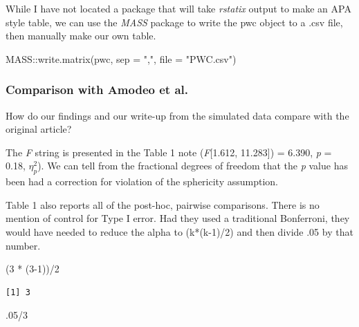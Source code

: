 \documentclass[
  11pt,
]{book}
\newenvironment{Shaded}{\begin{snugshade}}{\end{snugshade}}
\newcommand{\AttributeTok}[1]{\textcolor[rgb]{0.77,0.63,0.00}{#1}}
\newcommand{\DecValTok}[1]{\textcolor[rgb]{0.00,0.00,0.81}{#1}}
\newcommand{\FunctionTok}[1]{\textcolor[rgb]{0.00,0.00,0.00}{#1}}
\newcommand{\NormalTok}[1]{#1}
\newcommand{\SpecialCharTok}[1]{\textcolor[rgb]{0.00,0.00,0.00}{#1}}
\newcommand{\StringTok}[1]{\textcolor[rgb]{0.31,0.60,0.02}{#1}}
\begin{document}
While I have not located a package that will take \emph{rstatix} output to make an APA style table, we can use the \emph{MASS} package to write the pwc object to a .csv file, then manually make our own table.

\begin{Shaded}
\begin{Highlighting}[]
\NormalTok{MASS}\SpecialCharTok{::}\FunctionTok{write.matrix}\NormalTok{(pwc, }\AttributeTok{sep =} \StringTok{","}\NormalTok{, }\AttributeTok{file =} \StringTok{"PWC.csv"}\NormalTok{)}
\end{Highlighting}
\end{Shaded}

\hypertarget{comparison-with-amodeo-et-al.-amodeo_empowering_2018}{%
\subsubsection{\texorpdfstring{Comparison with Amodeo et al.\citeyearpar{amodeo_empowering_2018}}{Comparison with Amodeo et al.{[}-@amodeo\_empowering\_2018{]}}}\label{comparison-with-amodeo-et-al.-amodeo_empowering_2018}}

How do our findings and our write-up from the simulated data compare with the original article?

The \emph{F} string is presented in the Table 1 note (\emph{F}{[}1.612, 11.283{]}) = 6.390, \emph{p} = 0.18, \(\eta _{p}^{2}\)). We can tell from the fractional degrees of freedom that the \emph{p} value has been had a correction for violation of the sphericity assumption.

Table 1 also reports all of the post-hoc, pairwise comparisons. There is no mention of control for Type I error. Had they used a traditional Bonferroni, they would have needed to reduce the alpha to (k*(k-1)/2) and then divide .05 by that number.

\begin{Shaded}
\begin{Highlighting}[]
\NormalTok{(}\DecValTok{3} \SpecialCharTok{*}\NormalTok{ (}\DecValTok{3{-}1}\NormalTok{))}\SpecialCharTok{/}\DecValTok{2}
\end{Highlighting}
\end{Shaded}

\begin{verbatim}
[1] 3
\end{verbatim}

\begin{Shaded}
\begin{Highlighting}[]
\NormalTok{.}\DecValTok{05}\SpecialCharTok{/}\DecValTok{3}
\end{Highlighting}
\end{Shaded}
\end{document}
